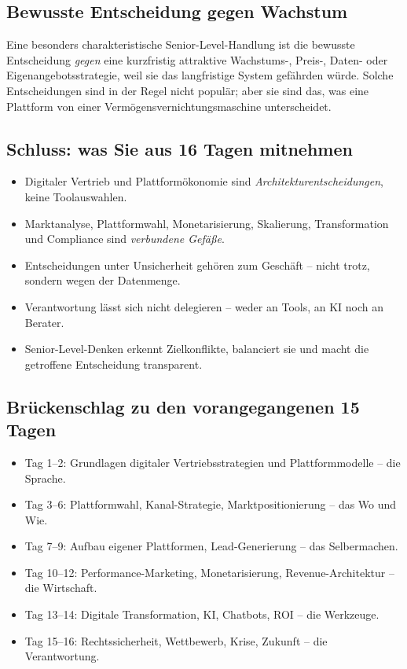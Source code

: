 \documentclass[11pt,a4paper,oneside]{article}
\begin{document}
\subsection{Bewusste Entscheidung gegen Wachstum}

Eine besonders charakteristische Senior-Level-Handlung ist die bewusste Entscheidung \emph{gegen} eine kurzfristig attraktive Wachstums-, Preis-, Daten- oder Eigenangebotsstrategie, weil sie das langfristige System gefährden würde. Solche Entscheidungen sind in der Regel nicht populär; aber sie sind das, was eine Plattform von einer Vermögensvernichtungsmaschine unterscheidet.

\subsection{Schluss: was Sie aus 16 Tagen mitnehmen}

\begin{itemize}
  \item Digitaler Vertrieb und Plattformökonomie sind \emph{Architekturentscheidungen}, keine Toolauswahlen.
  \item Marktanalyse, Plattformwahl, Monetarisierung, Skalierung, Transformation und Compliance sind \emph{verbundene Gefäße}.
  \item Entscheidungen unter Unsicherheit gehören zum Geschäft -- nicht trotz, sondern wegen der Datenmenge.
  \item Verantwortung lässt sich nicht delegieren -- weder an Tools, an KI noch an Berater.
  \item Senior-Level-Denken erkennt Zielkonflikte, balanciert sie und macht die getroffene Entscheidung transparent.
\end{itemize}

\subsection{Brückenschlag zu den vorangegangenen 15 Tagen}

\begin{itemize}
  \item Tag 1--2: Grundlagen digitaler Vertriebsstrategien und Plattformmodelle -- die Sprache.
  \item Tag 3--6: Plattformwahl, Kanal-Strategie, Marktpositionierung -- das Wo und Wie.
  \item Tag 7--9: Aufbau eigener Plattformen, Lead-Generierung -- das Selbermachen.
  \item Tag 10--12: Performance-Marketing, Monetarisierung, Revenue-Architektur -- die Wirtschaft.
  \item Tag 13--14: Digitale Transformation, KI, Chatbots, ROI -- die Werkzeuge.
  \item Tag 15--16: Rechtssicherheit, Wettbewerb, Krise, Zukunft -- die Verantwortung.
\end{itemize}
\end{document}
